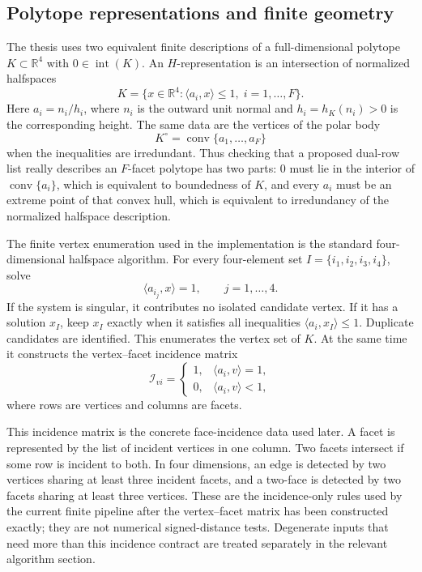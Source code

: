 \subsection{Polytope representations and finite geometry}
\label{subsec:preliminaries-polytope-finite-geometry}

The thesis uses two equivalent finite descriptions of a full-dimensional
polytope \(K\subset\mathbb{R}^4\) with \(0\in\operatorname{int}(K)\). An
\(H\)-representation is an intersection of normalized halfspaces
\[
  K=\{x\in\mathbb{R}^4:\langle a_i,x\rangle\leq 1,\; i=1,\ldots,F\}.
\]
Here \(a_i=n_i/h_i\), where \(n_i\) is the outward unit normal and
\(h_i=h_K(n_i)>0\) is the corresponding height. The same data are the vertices
of the polar body
\[
  K^\circ=\operatorname{conv}\{a_1,\ldots,a_F\}
\]
when the inequalities are irredundant. Thus checking that a proposed dual-row
list really describes an \(F\)-facet polytope has two parts: \(0\) must lie in
the interior of \(\operatorname{conv}\{a_i\}\), which is equivalent to
boundedness of \(K\), and every \(a_i\) must be an extreme point of that convex
hull, which is equivalent to irredundancy of the normalized halfspace
description.

The finite vertex enumeration used in the implementation is the standard
four-dimensional halfspace algorithm. For every four-element set
\(I=\{i_1,i_2,i_3,i_4\}\), solve
\[
  \langle a_{i_j},x\rangle=1,
  \qquad j=1,\ldots,4.
\]
If the system is singular, it contributes no isolated candidate vertex. If it
has a solution \(x_I\), keep \(x_I\) exactly when it satisfies all inequalities
\(\langle a_i,x_I\rangle\leq1\). Duplicate candidates are identified. This
enumerates the vertex set of \(K\). At the same time it constructs the
vertex--facet incidence matrix
\[
  \mathcal I_{v i}
  =
  \begin{cases}
    1,&\langle a_i,v\rangle=1,\\
    0,&\langle a_i,v\rangle<1,
  \end{cases}
\]
where rows are vertices and columns are facets.

This incidence matrix is the concrete face-incidence data used later. A facet
is represented by the list of incident vertices in one column. Two facets
intersect if some row is incident to both. In four dimensions, an edge is
detected by two vertices sharing at least three incident facets, and a
two-face is detected by two facets sharing at least three vertices. These
are the incidence-only rules used by the current finite pipeline after the
vertex--facet matrix has been constructed exactly; they are not numerical
signed-distance tests. Degenerate inputs that need more than this incidence
contract are treated separately in the relevant algorithm section.

